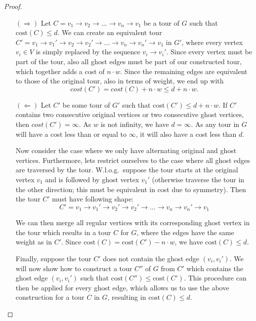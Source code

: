 \documentclass{article}
\begin{document}
\begin{proof}
    \begin{itemize}
        \item[$(\Rightarrow)$]  Let $C = v_1 \rightarrow v_2 \rightarrow \dots \rightarrow v_n \rightarrow v_1$ be a tour of $G$ such that $\text{cost}(C) \le d$. We can create an equivalent tour $C' = v_1 \rightarrow v_1' \rightarrow v_2\rightarrow v_2' \rightarrow \dots \rightarrow v_n \rightarrow v_n' \rightarrow v_1$ in $G'$, where every vertex $v_i \in V$ is simply replaced by the sequence $v_i \rightarrow v_i'$. Since every vertex must be part of the tour, also all ghost edges must be part of our constructed tour, which together adds a cost of $n \cdot w$. Since the remaining edges are equivalent to those of the original tour, also in terms of weight, we end up with \[cost(C') = cost(C) + n \cdot w \le d + n \cdot w.\]

        \item [$(\Leftarrow)$] Let $C'$ be some tour of $G'$ such that $\text{cost}(C') \le d + n \cdot w$. If $C'$ contains two consecutive original vertices or two consecutive ghost vertices, then $cost(C') = \infty$. As $w$ is not infinity, we have $d = \infty$. As any tour in $G$ will have a cost less than or equal to $\infty$, it will also have a cost less than $d$. 
        
        Now consider the case where we only have alternating original and ghost vertices. Furthermore, lets restrict ourselves to the case where all ghost edges are traversed by the tour. W.l.o.g.~suppose the tour starts at the original vertex $v_1$ and is followed by ghost vertex $v_1'$ (otherwise traverse the tour in the other direction; this must be equivalent in cost due to symmetry). Then the tour $C'$ must have following shape:
        \[
            C' = v_1 \rightarrow v_1' \rightarrow v_2'\rightarrow v_2' \rightarrow \dots \rightarrow v_n \rightarrow v_n' \rightarrow v_1
        \]
        
        We can then merge all regular vertices with its corresponding ghost vertex in the tour which results in a tour $C$ for $G$, where the edges have the same weight as in $C'$. Since $\text{cost}(C) = \text{cost}(C') - n \cdot w$, we have $\text{cost}(C) \le d$.

        Finally, suppose the tour $C'$ does not contain the ghost edge $(v_i, v_i')$. We will now show how to construct a tour $C''$ of $G$ from $C'$ which contains the ghost edge $(v_i, v_i')$ such that $\text{cost}(C'') \le \text{cost}(C')$. This procedure can then be applied for every ghost edge, which allows us to use the above construction for a tour $C$ in $G$, resulting in $\text{cost}(C) \le d$.

        
    \end{itemize}
    
   


\end{proof}
\end{document}

